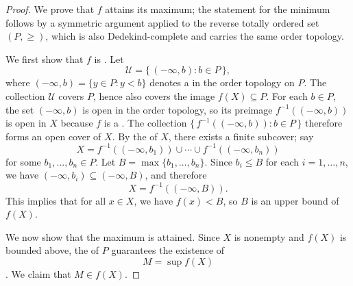 \begin{proof}
    We prove that $f$ attains its maximum; the statement for the minimum follows by a symmetric argument applied to the reverse totally ordered set $(P, \geq)$, which is also Dedekind-complete and carries the same order topology.

    We first show that $f$ is . Let
    $$\mathcal{U} = \{\, (-\infty, b) : b \in P \,\},$$
    where $(-\infty, b) = \{y \in P : y < b\}$ denotes a  in the order topology on $P$. The collection $\mathcal{U}$ covers $P$, hence also covers the image $f(X) \subseteq P$. For each $b \in P$, the set $(-\infty, b)$ is open in the order topology, so its preimage $f^{-1}((-\infty, b))$ is open in $X$ because $f$ is a . The collection $\{\, f^{-1}((-\infty, b)) : b \in P \,\}$ therefore forms an open cover of $X$. By the  of $X$, there exists a finite subcover; say
    $$X = f^{-1}((-\infty, b_1)) \cup \cdots \cup f^{-1}((-\infty, b_n))$$
    for some $b_1, \dots, b_n \in P$. Let $B = \max\{b_1, \dots, b_n\}$. Since $b_i \leq B$ for each $i = 1, \dots, n$, we have $(-\infty, b_i) \subseteq (-\infty, B)$, and therefore
    $$X = f^{-1}((-\infty, B)).$$
    This implies that for all $x \in X$, we have $f(x) < B$, so $B$ is an upper bound of $f(X)$.

    We now show that the maximum is attained. Since $X$ is nonempty and $f(X)$ is bounded above, the  of $P$ guarantees the existence of
    $$M = \sup f(X)$$
    . We claim that $M \in f(X)$.


\end{proof}
